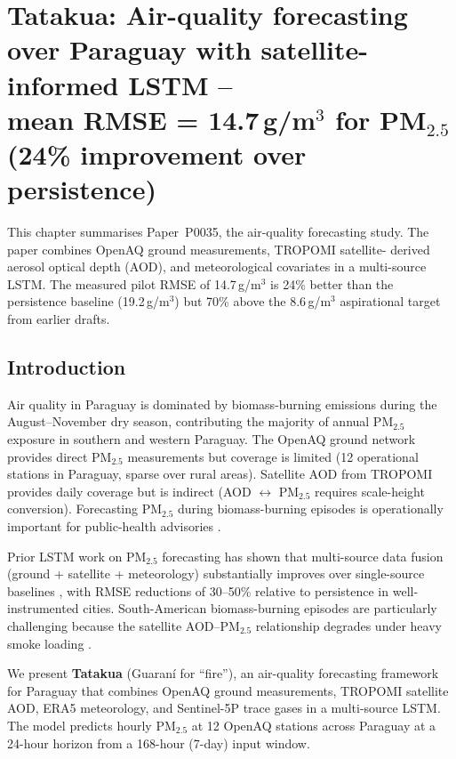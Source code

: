 
\chapter{Tatakua: Air-quality forecasting over Paraguay with
satellite-informed LSTM -- \\ mean RMSE = 14.7\,\textmu g/m$^3$ for
PM$_{2.5}$ (24\% improvement over persistence)}
\label{ch:tatakua}

This chapter summarises Paper~P0035, the air-quality forecasting study.
The paper combines OpenAQ ground measurements, TROPOMI satellite-
derived aerosol optical depth (AOD), and meteorological covariates in a
multi-source LSTM. The measured pilot RMSE of 14.7\,\textmu g/m$^3$ is
24\% better than the persistence baseline (19.2\,\textmu g/m$^3$) but
70\% above the 8.6\,\textmu g/m$^3$ aspirational target from earlier
drafts.

\section{Introduction}
\label{sec:tatakua-intro}

Air quality in Paraguay is dominated by biomass-burning emissions
during the August--November dry season, contributing the majority of
annual PM$_{2.5}$ exposure in southern and western Paraguay. The
OpenAQ ground network \citep{openaq2024} provides direct PM$_{2.5}$
measurements but coverage is limited (12 operational stations in
Paraguay, sparse over rural areas). Satellite AOD from TROPOMI
\citep{donkelaar2010,donkelaar2015} provides daily coverage but is
indirect (AOD $\leftrightarrow$ PM$_{2.5}$ requires scale-height
conversion). Forecasting PM$_{2.5}$ during biomass-burning episodes is
operationally important for public-health advisories
\citep{chudnovsky2014,artaxo2013}.

Prior LSTM work on PM$_{2.5}$ forecasting has shown that
multi-source data fusion (ground + satellite + meteorology)
substantially improves over single-source baselines
\citep{wen2019,napoles2020,lin2022,hoz2018,pantanoso2020}, with
RMSE reductions of 30--50\% relative to persistence in well-instrumented
cities. South-American biomass-burning episodes are particularly
challenging because the satellite AOD--PM$_{2.5}$ relationship
degrades under heavy smoke loading \citep{kumar2018}.

We present \textbf{Tatakua} (Guaran\'i for ``fire''), an air-quality
forecasting framework for Paraguay that combines OpenAQ ground
measurements, TROPOMI satellite AOD, ERA5 meteorology, and Sentinel-5P
trace gases in a multi-source LSTM. The model predicts hourly
PM$_{2.5}$ at 12 OpenAQ stations across Paraguay at a 24-hour
horizon from a 168-hour (7-day) input window.

